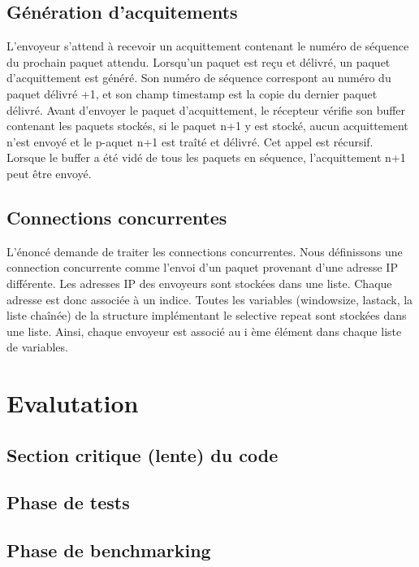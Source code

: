 \documentclass{article}
\begin{document}
\subsection{Génération d'acquitements}
L'envoyeur s'attend à recevoir un acquittement contenant le numéro de séquence du prochain paquet attendu. Lorsqu'un paquet est reçu et délivré, un paquet d'acquittement est généré. Son numéro de séquence correspont au numéro du paquet délivré +1, et son champ timestamp est la copie du dernier paquet délivré.
Avant d'envoyer le paquet d'acquittement, le récepteur vérifie son buffer contenant les paquets stockés, si le paquet n+1 y est stocké, aucun acquittement n'est envoyé et le p-aquet n+1 est traîté et délivré. Cet appel est récursif. Lorsque le buffer a été vidé de tous les paquets en séquence, l'acquittement n+1 peut être envoyé.
\subsection{Connections concurrentes}
L'énoncé demande de traiter les connections concurrentes. Nous définissons une connection concurrente comme l'envoi d'un paquet provenant d'une adresse IP différente. Les adresses IP des envoyeurs sont stockées dans une liste. Chaque adresse est donc associée à un indice. Toutes les variables (windowsize, lastack, la liste chaînée) de la structure implémentant le selective repeat sont stockées dans une liste. Ainsi, chaque envoyeur est associé au i ème élément dans chaque liste de variables.

\section{Evalutation}

\subsection{Section critique (lente) du code}
\subsection{Phase de tests}

\subsection{Phase de benchmarking}
\end{document}
